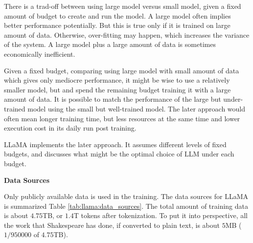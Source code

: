 There is a trad-off between using large model versus small model, given a fixed amount of budget to create and run the model. A large model often implies better performance potentially. But this is true only if it is trained on large amount of data. Otherwise, over-fitting may happen, which increases the variance of the system. A large model plus a large amount of data is sometimes economically inefficient.

Given a fixed budget, comparing using large model with small amount of data which gives only mediocre performance, it might be wise to use a relatively smaller model, but and spend the remaining budget training it with a large amount of data. It is possible to match the performance of the large but under-trained model using the small but well-trained model. The later approach would often mean longer training time, but less resources at the same time and lower execution cost in its daily run post training.

LLaMA implements the later approach. It assumes different levels of fixed budgets, and discusses what might be the optimal choice of LLM under each budget.

\vspace{0.1in}
\noindent \textbf{Data Sources}
\vspace{0.1in}

Only publicly available data is used in the training. The data sources for LLaMA is summarized Table \ref{tab:llama:data_sources}. The total amount of training data is about $4.75$TB, or $1.4$T tokens after tokenization. To put it into perspective, all the work that Shakespeare has done, if converted to plain text, is about $5$MB ($1/950000$ of $4.75$TB).

